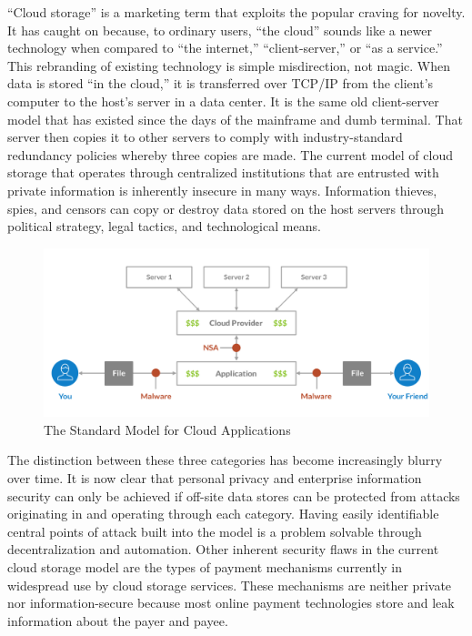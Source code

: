 \documentclass[a4paper,10pt]{article}
\begin{document}
“Cloud storage” is a marketing term that exploits the popular craving for novelty. It has caught on because, to ordinary users, “the cloud” sounds like a newer technology when compared to “the internet,” “client-server,” or “as a service.” This rebranding of existing technology is simple misdirection, not magic.  When data is stored “in the cloud,” it is transferred over TCP/IP from the client’s computer to the host’s server in a data center.  It is the same old client-server model that has existed since the days of the mainframe and dumb terminal. That server then copies it to other servers to comply with industry-standard redundancy policies whereby three copies are made. The current model of cloud storage that operates through centralized institutions that are entrusted with private information is inherently insecure in many ways.  Information thieves, spies, and censors can copy or destroy data stored on the host servers through political strategy, legal tactics, and technological means.  \\

\begin{figure}[h!]
  \centering
      \includegraphics[width=\linewidth]{01}
  \caption{The Standard Model for Cloud Applications}
\end{figure}

The distinction between these three categories has become increasingly blurry over time. It is now clear that personal privacy and enterprise information security can only be achieved if off-site data stores can be protected from attacks originating in and operating through each category.  Having easily identifiable central points of attack built into the model is a problem solvable through decentralization and automation. Other inherent security flaws in the current cloud storage model are the types of payment mechanisms currently in widespread use by cloud storage services.  These mechanisms are neither private nor information-secure because most online payment technologies store and leak information about the payer and payee.\\
\end{document}
